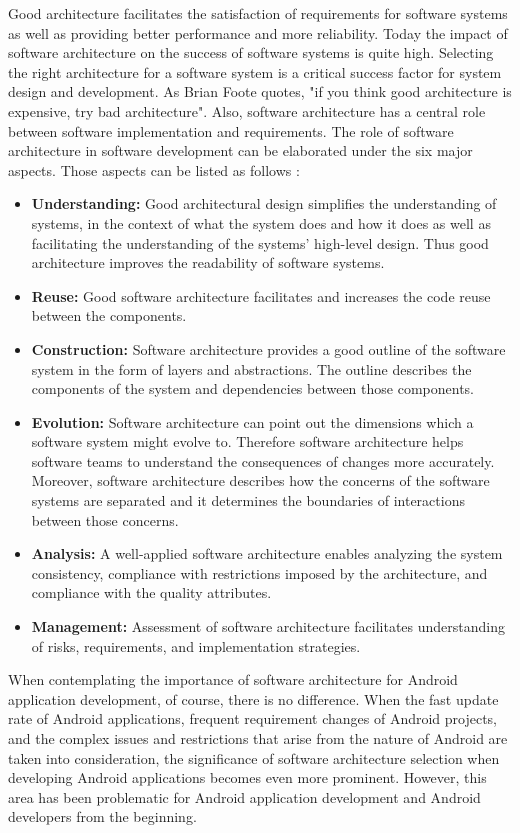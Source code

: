 Good architecture facilitates the satisfaction of requirements for software systems as well as providing better performance and more reliability. Today the impact of software architecture on the success of software systems is quite high. Selecting the right architecture for a software system is a critical success factor for system design and development. As Brian Foote quotes, "if you think good architecture is expensive, try bad architecture"\cite{43}. Also, software architecture has a central role between software implementation and requirements. The role of software architecture in software development can be elaborated under the six major aspects. Those aspects can be listed as follows \cite{25}:
\begin{itemize}
    \item \textbf{Understanding:} Good architectural design simplifies the understanding of systems, in the context of what the system does and how it does as well as facilitating the understanding of the systems’ high-level design. Thus good architecture improves the readability of software systems.
    \item \textbf{Reuse:} Good software architecture facilitates and increases the code reuse between the components.
    \item \textbf{Construction:} Software architecture provides a good outline of the software system in the form of layers and abstractions. The outline describes the components of the system and dependencies between those components.
    \item \textbf{Evolution:} Software architecture can point out the dimensions which a software system might evolve to. Therefore software architecture helps software teams to understand the consequences of changes more accurately. Moreover, software architecture describes how the concerns of the software systems are separated and it determines the boundaries of interactions between those concerns. 
    \item \textbf{Analysis:} A well-applied software architecture enables analyzing the system consistency, compliance with restrictions imposed by the architecture, and compliance with the quality attributes.
    \item \textbf{Management:} Assessment of software architecture facilitates understanding of risks, requirements, and implementation strategies.
\end{itemize}
When contemplating the importance of software architecture for Android application development, of course, there is no difference. When the fast update rate of Android applications, frequent requirement changes of Android projects, and the complex issues and restrictions that arise from the nature of Android are taken into consideration, the significance of software architecture selection when developing Android applications becomes even more prominent. However, this area has been problematic for Android application development and Android developers from the beginning.

